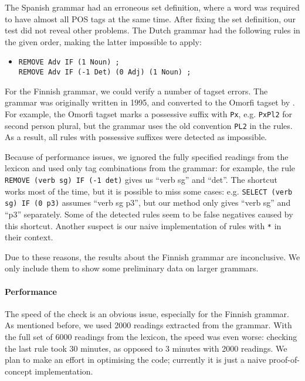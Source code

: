 The Spanish grammar had an erroneous set definition, where a word was
required to have almost all POS tags at the same time. After fixing
the set definition, our test did not reveal other problems.
The Dutch grammar had the following rules in the given order, making the latter impossible to apply:
\begin{itemize}
\item[] 
\begin{verbatim}REMOVE Adv IF (1 Noun) ;
REMOVE Adv IF (-1 Det) (0 Adj) (1 Noun) ;
\end{verbatim}
\end{itemize}

For the Finnish grammar, we could verify a number of tagset errors. 
The grammar was originally written in 1995, and converted to the
Omorfi tagset by \cite{pirinen2015}. For example, the Omorfi tagset
marks a possessive suffix with \texttt{Px}, e.g. \texttt{PxPl2} for second person plural, but the
grammar uses the old convention \texttt{PL2} in the rules.
As a result, all rules with possessive suffixes were detected as
impossible.

Because of performance issues, we ignored the fully specified readings from the
lexicon and used only tag combinations from the grammar:
for example, the rule \texttt{REMOVE (verb sg) IF (-1 det)}
gives us ``verb sg'' and ``det''.
The shortcut works most of the time, but it is possible to
miss some cases: e.g. \texttt{SELECT (verb sg) IF (0 p3)} 
assumes ``verb sg p3'', but our method only gives
``verb sg'' and ``p3'' separately. 
Some of the detected rules seem to be false negatives caused by this shortcut. 
Another suspect is our naive implementation of rules with \verb!*! in
their context.

Due to these reasons, the results about the Finnish grammar are
inconclusive. We only include them to show some preliminary data on larger grammars.

\paragraph{Performance} The speed of the check is an obvious issue,
especially for the Finnish grammar. 
As mentioned before, we used 2000 readings extracted from the grammar.
With the full set of 6000 readings from the lexicon, the speed
was even worse: checking the last rule took 30 minutes, as opposed to
3 minutes with 2000 readings. 
We plan to make an effort in optimising the code; currently it is just
a naive proof-of-concept implementation.


